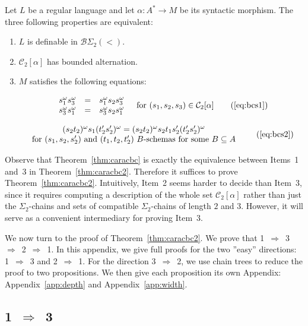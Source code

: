 \documentclass[envcountsame]{llncs}
\newcommand\Cs{\ensuremath{\mathcal{C}}\xspace}
\newcommand\Cstwo{\ensuremath{\Cs_2}\xspace}
\newcommand{\sic}[1]{\ensuremath{\Sigma_{#1}}\xspace}
\newcommand{\bswd}{\ensuremath{\mathcal{B}\Sigma_{2}(<)}\xspace}
\newcommand\chain{chain\xspace}
\newcommand\qchains[1]{\ensuremath{\sic{#1}}-chains\xspace}
\newcommand\dchains{\qchains{2}}
\begin{document}
\begin{theorem} \label{thm:caracbc2}
  Let $L$ be a regular language and let $\alpha: A^* \rightarrow M$ be its
  syntactic morphism. The three following properties are equivalent:

  \begin{enumerate}
  \item $L$ is definable in \bswd.
  \item $\Cstwo[\alpha]$ has bounded alternation.
  \item $M$ satisfies the following equations:

    \[
    \begin{array}{rcl}
      s_1^{\omega}s_3^{\omega} & = & s_1^{\omega}s_2s_3^{\omega} \\
      s_3^{\omega}s_1^{\omega} & = & s_3^{\omega}s_2s_1^{\omega}
    \end{array} \quad \text{for $(s_1,s_2,s_3) \in \Cstwo[\alpha]$} \tag{\ref{eq:bcs1}}
    \]

    \[
    \begin{array}{c}
      (s_2t_2)^{\omega}s_1(t'_2s'_2)^{\omega} = (s_2t_2)^{\omega}s_2t_1s'_2(t'_2s'_2)^{\omega} \\
      \text{for $(s_1,s_2,s'_2)$ and $(t_1,t_2,t'_2)$ $B$-schemas for some
        $B \subseteq A$}
    \end{array}\tag{\ref{eq:bcs2}}
    \]
  \end{enumerate}
\end{theorem}

Observe that Theorem~\ref{thm:caracbc} is exactly the equivalence
between Items~1 and~3 in Theorem~\ref{thm:caracbc2}. Therefore it
suffices to prove Theorem~\ref{thm:caracbc2}. Intuitively, Item~2
seems harder to decide than Item~3, since it requires computing a
description of the whole set $\Cstwo[\alpha]$ rather than just the
\dchains and sets of compatible \dchains of length $2$ and
$3$. However, it will serve as a convenient intermediary for proving
Item~3.

We now turn to the proof of Theorem~\ref{thm:caracbc2}. We prove that
1~$\Rightarrow$~3~$\Rightarrow$~2~$\Rightarrow$~1. In this appendix,
we give full proofs for the two ''easy'' directions: 1~$\Rightarrow$~3 
and 2~$\Rightarrow$~1. For the direction 3~$\Rightarrow$~2, we use
\chain trees to reduce the proof to two propositions. We then give
each proposition its own Appendix: Appendix~\ref{app:depth} and
Appendix~\ref{app:width}.

\subsection{1~$\Rightarrow$~3}
\label{sec:1-rightarrow-3-1}
\end{document}
